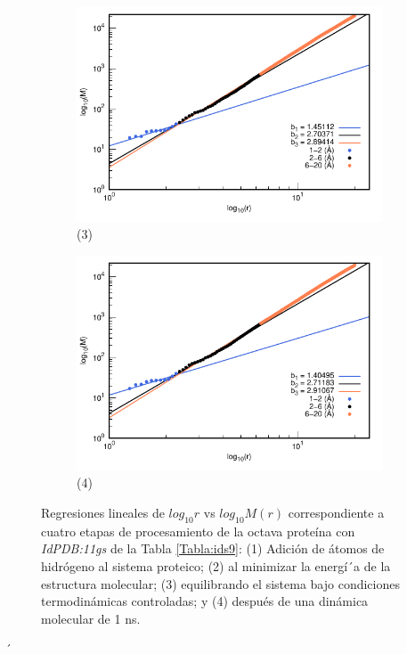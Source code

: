 \begin{figure}[H]
	\vspace{0cm} %
	
	\hspace{-0.3cm} 
	\begin{subfigure}{0.49\textwidth}
		\centering
		\includegraphics[width=\linewidth,page=1]{graphs/PDBs/11gs/11gsEq.pdf}
		\caption{(3)}
	\end{subfigure}
	\hspace{0.2cm}
	\begin{subfigure}{0.49\textwidth} %
		\centering
		\includegraphics[width=\linewidth,page=1]{graphs/PDBs/11gs/11gs1ns.pdf}
		\caption{(4)}
	\end{subfigure}
	
	\caption{Regresiones lineales de $log_{10}r$ vs $log_{10}M(r)$ correspondiente a cuatro etapas de procesamiento de la octava prote\'{i}na con \textit{IdPDB:11gs} de la Tabla \ref{Tabla:ids9}: (1) Adici\'{o}n de \'{a}tomos de hidr\'{o}geno al sistema proteico; (2) al minimizar la energ\'{i´}a de la estructura molecular; (3) equilibrando el sistema bajo condiciones termodin\'{a}micas controladas; y (4) despu\'{e}s de una din\'{a}mica molecular de 1 ns.}
	\label{fig:11gs}
\end{figure}
´


